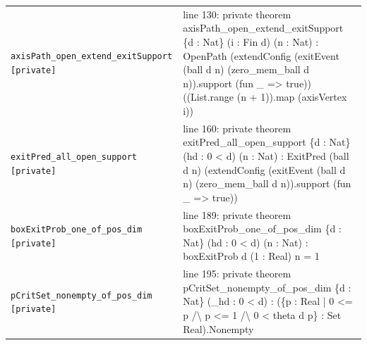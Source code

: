 \documentclass[10pt]{article}
\begin{document}
\begin{longtable}{>{\raggedright\arraybackslash}p{} >{\raggedright\arraybackslash}p{}}
\texttt{axisPath\_\allowbreak{}open\_\allowbreak{}extend\_\allowbreak{}exitSupport [private]} & {\ttfamily\scriptsize line 130:\allowbreak{} private theorem axisPath\_\allowbreak{}open\_\allowbreak{}extend\_\allowbreak{}exitSupport \{d :\allowbreak{} Nat\} (\allowbreak{}i :\allowbreak{} Fin d)\allowbreak{} (\allowbreak{}n :\allowbreak{} Nat)\allowbreak{} :\allowbreak{} OpenPath (\allowbreak{}extendConfig (\allowbreak{}exitEvent (\allowbreak{}ball d n)\allowbreak{} (\allowbreak{}zero\_\allowbreak{}mem\_\allowbreak{}ball d n)\allowbreak{})\allowbreak{}.\allowbreak{}support (\allowbreak{}fun \_\allowbreak{} =\allowbreak{}> true)\allowbreak{})\allowbreak{} (\allowbreak{}(\allowbreak{}List.\allowbreak{}range (\allowbreak{}n +\allowbreak{} 1)\allowbreak{})\allowbreak{}.\allowbreak{}map (\allowbreak{}axisVertex i)\allowbreak{})\allowbreak{}} \\[0.45em]
\texttt{exitPred\_\allowbreak{}all\_\allowbreak{}open\_\allowbreak{}support [private]} & {\ttfamily\scriptsize line 160:\allowbreak{} private theorem exitPred\_\allowbreak{}all\_\allowbreak{}open\_\allowbreak{}support \{d :\allowbreak{} Nat\} (\allowbreak{}hd :\allowbreak{} 0 < d)\allowbreak{} (\allowbreak{}n :\allowbreak{} Nat)\allowbreak{} :\allowbreak{} ExitPred (\allowbreak{}ball d n)\allowbreak{} (\allowbreak{}extendConfig (\allowbreak{}exitEvent (\allowbreak{}ball d n)\allowbreak{} (\allowbreak{}zero\_\allowbreak{}mem\_\allowbreak{}ball d n)\allowbreak{})\allowbreak{}.\allowbreak{}support (\allowbreak{}fun \_\allowbreak{} =\allowbreak{}> true)\allowbreak{})\allowbreak{}} \\[0.45em]
\texttt{boxExitProb\_\allowbreak{}one\_\allowbreak{}of\_\allowbreak{}pos\_\allowbreak{}dim [private]} & {\ttfamily\scriptsize line 189:\allowbreak{} private theorem boxExitProb\_\allowbreak{}one\_\allowbreak{}of\_\allowbreak{}pos\_\allowbreak{}dim \{d :\allowbreak{} Nat\} (\allowbreak{}hd :\allowbreak{} 0 < d)\allowbreak{} (\allowbreak{}n :\allowbreak{} Nat)\allowbreak{} :\allowbreak{} boxExitProb d (\allowbreak{}1 :\allowbreak{} Real)\allowbreak{} n =\allowbreak{} 1} \\[0.45em]
\texttt{pCritSet\_\allowbreak{}nonempty\_\allowbreak{}of\_\allowbreak{}pos\_\allowbreak{}dim [private]} & {\ttfamily\scriptsize line 195:\allowbreak{} private theorem pCritSet\_\allowbreak{}nonempty\_\allowbreak{}of\_\allowbreak{}pos\_\allowbreak{}dim \{d :\allowbreak{} Nat\} (\allowbreak{}\_\allowbreak{}hd :\allowbreak{} 0 < d)\allowbreak{} :\allowbreak{} (\allowbreak{}\{p :\allowbreak{} Real | 0 <=\allowbreak{} p /\allowbreak{}\textbackslash{} p <=\allowbreak{} 1 /\allowbreak{}\textbackslash{} 0 < theta d p\} :\allowbreak{} Set Real)\allowbreak{}.\allowbreak{}Nonempty} \\[0.45em]

\end{longtable}
\end{document}
